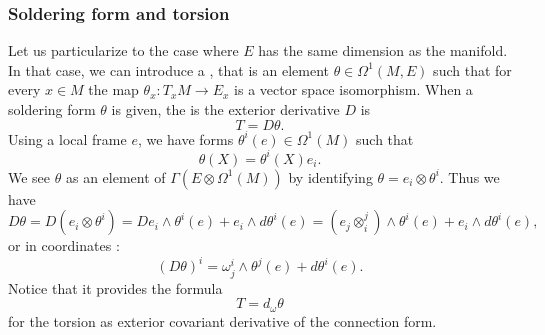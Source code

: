 \subsubsection{Soldering form and torsion}


Let us particularize to the case where $E$ has the same dimension as the manifold. In that case, we can introduce a , that is an element $\theta\in \Omega^1(M,E)$ such that for every $x\in M$ the map $\theta_x\colon T_xM\to E_x$ is a vector space isomorphism.
When a soldering form $\theta$ is given, the  is the exterior derivative $D$ is
\begin{equation}
	T=D\theta.
\end{equation}
Using a local frame $e$, we have forms $\theta^i(e)\in\Omega^1(M)$ such that
\[ 
  \theta(X)=\theta^i(X)e_i.
\]
We see $\theta$ as an element of $\Gamma(E\otimes \Omega^1(M))$ by identifying $\theta=e_i\otimes\theta^i$. Thus we have
\[ 
D\theta=D(e_i\otimes\theta^i)	=De_i\wedge\theta^i(e)+e_i\wedge d\theta^i(e)
				=(e_j\otimes^j_i)\wedge\theta^i(e)+e_i\wedge d\theta^i(e),
\]
or in coordinates :
\begin{equation}
  (D\theta)^i=\omega_j^i\wedge \theta^j(e)+d\theta^i(e).
\end{equation}
Notice that it provides the formula
\begin{equation}
T=d_{\omega}\theta
\end{equation}
for the torsion as exterior covariant derivative of the connection form.

